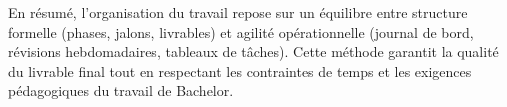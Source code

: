 En résumé, l’organisation du travail repose sur un équilibre entre structure formelle (phases, jalons, livrables) et agilité opérationnelle (journal de bord, révisions hebdomadaires, tableaux de tâches). Cette méthode garantit la qualité du livrable final tout en respectant les contraintes de temps et les exigences pédagogiques du travail de Bachelor.
